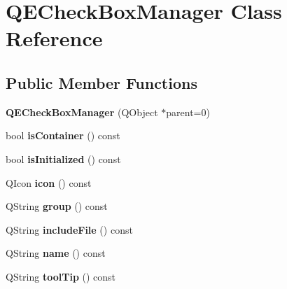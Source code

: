 \hypertarget{classQECheckBoxManager}{
\section{QECheckBoxManager Class Reference}
\label{classQECheckBoxManager}
}
\subsection*{Public Member Functions}
\begin{DoxyCompactItemize}
\item 
\hypertarget{classQECheckBoxManager_ace356c28242fa7eab76757c5a2896306}{
{\bfseries QECheckBoxManager} (QObject $\ast$parent=0)}
\label{classQECheckBoxManager_ace356c28242fa7eab76757c5a2896306}

\item 
\hypertarget{classQECheckBoxManager_a9ffb06abae854c617d95eff6e05251b7}{
bool {\bfseries isContainer} () const }
\label{classQECheckBoxManager_a9ffb06abae854c617d95eff6e05251b7}

\item 
\hypertarget{classQECheckBoxManager_a70c6ecc07ce7b906faf2cf77332d64fd}{
bool {\bfseries isInitialized} () const }
\label{classQECheckBoxManager_a70c6ecc07ce7b906faf2cf77332d64fd}

\item 
\hypertarget{classQECheckBoxManager_a5c43d6a2637a4dcc8a64d786ec354c5d}{
QIcon {\bfseries icon} () const }
\label{classQECheckBoxManager_a5c43d6a2637a4dcc8a64d786ec354c5d}

\item 
\hypertarget{classQECheckBoxManager_a74969e6f38f2a29715083e1f25285a09}{
QString {\bfseries group} () const }
\label{classQECheckBoxManager_a74969e6f38f2a29715083e1f25285a09}

\item 
\hypertarget{classQECheckBoxManager_a042d11dda7a7fd93c29b081cc579b7bc}{
QString {\bfseries includeFile} () const }
\label{classQECheckBoxManager_a042d11dda7a7fd93c29b081cc579b7bc}

\item 
\hypertarget{classQECheckBoxManager_a77f0b7d28dcb7ad3d70cd3c9eaf3004d}{
QString {\bfseries name} () const }
\label{classQECheckBoxManager_a77f0b7d28dcb7ad3d70cd3c9eaf3004d}

\item 
\hypertarget{classQECheckBoxManager_ae74ab3678aaf94ad09280c3737cb4c3b}{
QString {\bfseries toolTip} () const }
\label{classQECheckBoxManager_ae74ab3678aaf94ad09280c3737cb4c3b}


\end{DoxyCompactItemize}
